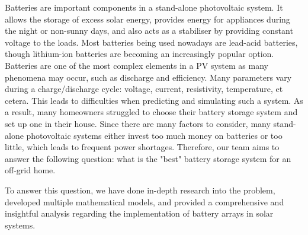 Batteries are important components in a stand-alone photovoltaic system. It allows the storage of excess solar energy, provides energy for appliances during the night or non-sunny days, and also acts as a stabiliser by providing constant voltage to the loads. Most batteries being used nowadays are lead-acid batteries, though lithium-ion batteries are becoming an increasingly popular option. Batteries are one of the most complex elements in a PV system as many phenomena may occur, such as discharge and efficiency. Many parameters vary during a charge/discharge cycle: voltage, current, resistivity, temperature, et cetera. This leads to difficulties when predicting and simulating such a system. As a result, many homeowners struggled to choose their battery storage system and set up one in their house. Since there are many factors to consider, many stand-alone photovoltaic systems either invest too much money on batteries or too little, which leads to frequent power shortages. Therefore, our team aims to answer the following question: what is the "best" battery storage system for an off-grid home.

To answer this question, we have done in-depth research into the problem, developed multiple mathematical models, and provided a comprehensive and insightful analysis regarding the implementation of battery arrays in solar systems.
